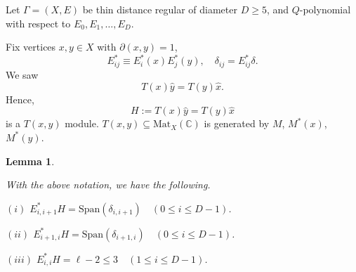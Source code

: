 \documentclass[
]{book}
\newtheorem{lemma}{Lemma}[chapter]
\theoremstyle{definition}
\theoremstyle{definition}
\theoremstyle{definition}
\theoremstyle{definition}
\theoremstyle{remark}
\begin{document}
Let \(\Gamma = (X, E)\) be thin distance regular of diameter \(D\geq 5\), and \(Q\)-polynomial with respect to \(E_0, E_1, \ldots, E_D\).

Fix vertices \(x,y\in X\) with \(\partial(x,y) = 1\),
\[E^*_{ij} \equiv E^*_i(x)E^*_j(y), \quad \delta_{ij} = E^*_{ij}\delta.\]
We saw
\[T(x)\hat{y} = T(y)\hat{x}.\]
Hence,
\[H := T(x)\hat{y} = T(y)\hat{x}\]
is a \(T(x,y)\) module.
\(T(x,y) \subseteq \mathrm{Mat}_X(\mathbb{C})\) is generated by \(M\), \(M^*(x)\), \(M^*(y)\).

\begin{lemma}
\protect\hypertarget{lem:h}{}\label{lem:h}

With the above notation, we have the following.

\((i)\) \(E^*_{i,i+1}H = \mathrm{Span}(\delta_{i,i+1}) \quad (0\leq i\leq D-1)\).

\((ii)\) \(E^*_{i+1,i}H = \mathrm{Span}(\delta_{i+1,i}) \quad (0\leq i\leq D-1)\).

\((iii)\) \(E^*_{i,i}H = \ell-2 \leq 3 \quad (1\leq i\leq D-1)\).

\end{lemma}
\end{document}
